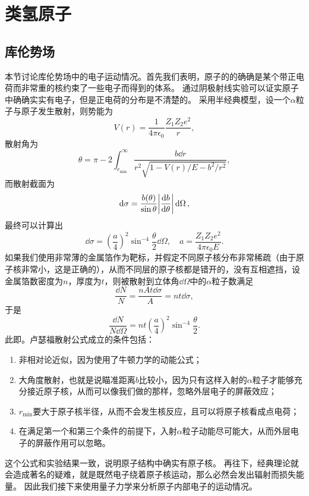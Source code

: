\chapter{类氢原子}

\section{库伦势场}

本节讨论库伦势场中的电子运动情况。首先我们表明，原子的的确确是某个带正电荷而非常重的核约束了一些电子而得到的体系。
通过阴极射线实验可以证实原子中确确实实有电子，但是正电荷的分布是不清楚的。
采用半经典模型，设一个$\alpha$粒子与原子发生散射，则势能为
\begin{equation}
    V(r) = \frac{1}{4\pi \epsilon_0} \frac{Z_1 Z_2 e^2}{r}, 
\end{equation}
散射角为
\[
    \theta = \pi - 2 \int_{r_\text{min}}^\infty \frac{b \dd{r}}{r^2 \sqrt{1 - V(r)/E - b^2/r^2}},  
\]
而散射截面为
\[
    \dd{\sigma} = \frac{b(\theta)}{\sin \theta} \abs{\dv{b}{\theta}} \dd{\Omega},
\]
最终可以计算出
\begin{equation}
    \dd{\sigma} = \left(\frac{a}{4}\right)^2 \sin^{-4}\frac{\theta}{2} \dd{\Omega}, \quad a = \frac{Z_1 Z_2 e^2}{4\pi \epsilon_0 E}.    
\end{equation}
如果我们使用非常薄的金属箔作为靶标，并假定不同原子核分布非常稀疏（由于原子核非常小，这是正确的），从而不同层的原子核都是错开的，没有互相遮挡，设金属箔数密度为$n$，厚度为$t$，则被散射到立体角$\dd{\Omega}$中的$\alpha$粒子数满足
\[
    \frac{\dd{N}}{N} = \frac{n A t \dd{\sigma}}{A} = nt \dd{\sigma},
\]
于是
\begin{equation}
    \frac{\dd{N}}{N \dd{\Omega}} = n t \left(\frac{a}{4}\right)^2 \sin^{-4}\frac{\theta}{2}.
\end{equation}
此即。卢瑟福散射公式成立的条件包括：
\begin{enumerate}
    \item 非相对论近似，因为使用了牛顿力学的动能公式；
    \item 大角度散射，也就是说瞄准距离$b$比较小，因为只有这样入射的$\alpha$粒子才能够充分接近原子核，从而可以像我们做的那样，忽略外层电子的屏蔽效应；
    \item $r_\text{min}$要大于原子核半径，从而不会发生核反应，且可以将原子核看成点电荷；
    \item 在满足第一个和第三个条件的前提下，入射$\alpha$粒子动能尽可能大，从而外层电子的屏蔽作用可以忽略。
\end{enumerate}
这个公式和实验结果一致，说明原子结构中确实有原子核。
再往下，经典理论就会造成著名的疑难，就是既然电子绕着原子核运动，那么必然会发出辐射而损失能量。
因此我们接下来使用量子力学来分析原子内部电子的运动情况。

